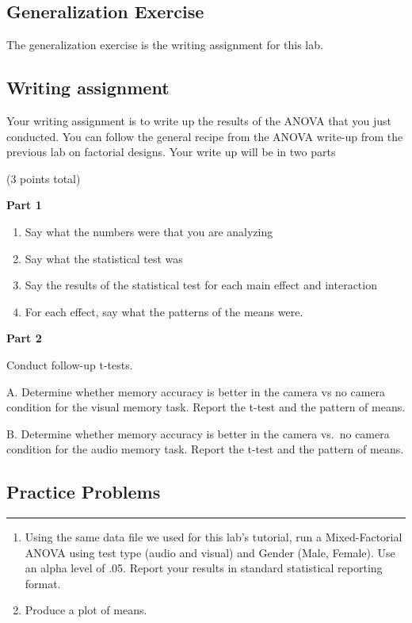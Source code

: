 \documentclass[
]{book}
\providecommand{\tightlist}{%
  \setlength{\itemsep}{0pt}\setlength{\parskip}{0pt}}
\begin{document}
\hypertarget{generalization-exercise-10}{%
\subsection{Generalization Exercise}\label{generalization-exercise-10}}

The generalization exercise is the writing assignment for this lab.

\hypertarget{writing-assignment-9}{%
\subsection{Writing assignment}\label{writing-assignment-9}}

Your writing assignment is to write up the results of the ANOVA that you
just conducted. You can follow the general recipe from the ANOVA
write-up from the previous lab on factorial designs. Your write up will
be in two parts

(3 points total)

\textbf{Part 1}

\begin{enumerate}
\def\labelenumi{\arabic{enumi}.}
\tightlist
\item
  Say what the numbers were that you are analyzing
\item
  Say what the statistical test was
\item
  Say the results of the statistical test for each main effect and
  interaction
\item
  For each effect, say what the patterns of the means were.
\end{enumerate}

\textbf{Part 2}

Conduct follow-up t-tests.

A. Determine whether memory accuracy is better in the camera vs no
camera condition for the visual memory task. Report the t-test and the
pattern of means.

B. Determine whether memory accuracy is better in the camera vs.~no
camera condition for the audio memory task. Report the t-test and the
pattern of means.

\hypertarget{practice-problems-9}{%
\subsection{Practice Problems}\label{practice-problems-9}}

\begin{center}\rule{0.5\linewidth}{0.5pt}\end{center}

\begin{enumerate}
\def\labelenumi{\arabic{enumi}.}
\item
  Using the same data file we used for this lab's tutorial, run a
  Mixed-Factorial ANOVA using test type (audio and visual) and Gender
  (Male, Female). Use an alpha level of .05. Report your results in
  standard statistical reporting format.
\item
  Produce a plot of means.
\end{enumerate}

  
\end{document}
